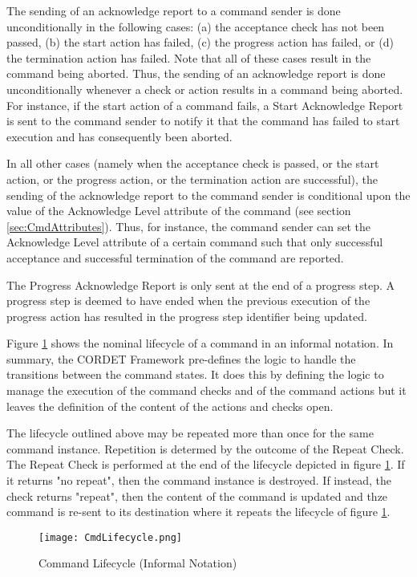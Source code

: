 The sending of an acknowledge report to a command sender is done unconditionally in the following cases: (a) the acceptance check has not been passed, (b) the start action has failed, (c) the progress action has failed, or (d) the termination action has failed. Note that all of these cases result in the command being aborted. Thus, the sending of an acknowledge report is done unconditionally whenever a check or action results in a command being aborted. For instance, if the start action of a command fails, a Start Acknowledge Report is sent to the command sender to notify it that the command has failed to start execution and has consequently been aborted.

In all other cases (namely when the acceptance check is passed, or the start action, or the progress action, or the termination action are successful), the sending of the acknowledge report to the command sender is conditional upon the value of the Acknowledge Level attribute of the command (see section \ref{sec:CmdAttributes}). Thus, for instance, the command sender can set the Acknowledge Level attribute of a certain command such that only successful acceptance and successful termination of the command are reported. 

The Progress Acknowledge Report is only sent at the end of a progress step. A progress step is deemed to have ended when the previous execution of the progress action has resulted in the progress step identifier being updated.

Figure \ref{fig:CmdLifecycle} shows the nominal lifecycle of a command in an informal notation. In summary, the CORDET Framework pre-defines the logic to handle the transitions between the command states. It does this by defining the logic to manage the execution of the command checks and of the command actions but it leaves the definition of the content of the actions and checks open. 

The lifecycle outlined above may be repeated more than once for the same command instance. Repetition is determed by the outcome of the Repeat Check. The Repeat Check is performed at the end of the lifecycle depicted in figure \ref{fig:CmdLifecycle}. If it returns "no repeat", then the command instance is destroyed. If instead, the check returns "repeat", then the content of the command is updated and thze command is re-sent to its destination where it repeats the lifecycle of figure \ref{fig:CmdLifecycle}.

\begin{figure}[ht]
 \centering
 \texttt{[image: CmdLifecycle.png]}
 \caption{Command Lifecycle (Informal Notation)}
 \label{fig:CmdLifecycle}
\end{figure}


